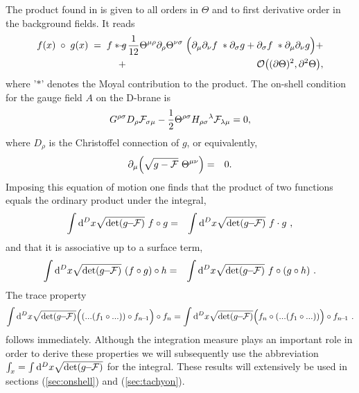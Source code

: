 \documentclass[a4paper,11pt]{article}               \def\new#1\endnew{{\bf #1}}
\newcommand {\ud} {\mathrm{d}}
\newcommand {\cF} {{\cal F}}
\newcommand {\cO}{{\cal O}}
\newcommand {\Back}{\!\!\!\!\!}
\begin{document}
The product found in \cite{Herbst:2001ai} is given to all orders in
$\Theta$ and to
first derivative order in the background fields. It reads
\begin{eqnarray}
  \label{eq:NCP}
  f(x) \; \circ \; g(x) \;=\; f * g 
  \Back&-&\Back \frac 1{12}
  \Theta^{\mu\rho} \partial_\rho \Theta^{\nu\sigma} \;
  \Bigl(\partial_\mu \partial_\nu f \;* \partial_\sigma g +
  \partial_\sigma f \;* \partial_\mu \partial_\nu g \Bigr) +\nonumber\\
  &+& \cO\bigl((\partial\Theta)^2,\partial^2\Theta\bigr) ,
\end{eqnarray}
where '$*$' denotes the Moyal contribution to the product. The
on-shell condition for the gauge field $A$ on the D-brane is
\begin{eqnarray}
  \label{eq:maxwell}
  G^{\rho\sigma}D_\rho \cF_{\sigma\mu}
  -\frac 12 \Theta^{\rho\sigma}H_{\rho\sigma}{}^\lambda \cF_{\lambda\mu} = 0,
\end{eqnarray}
where $D_\rho$ is the Christoffel connection of $g$, or equivalently,
\begin{eqnarray}
  \label{eq:eom1}
  \partial_\mu \Bigl(\sqrt{g-\cF}~\Theta^{\mu\nu}\Bigr) &=& 0.
\end{eqnarray}
Imposing this equation of motion one finds %
that the product of
two functions equals the ordinary product under the integral,
\begin{eqnarray}
  \label{eq:ordprod}
  \int \ud^{D} x \sqrt {\det(g\!\!-\!\!\cF)} ~f \circ g &=& 
  \int \ud^{D} x \sqrt {\det(g\!\!-\!\!\cF)} ~f \cdot g ~,
\end{eqnarray}
and %
that it is associative up to a surface term,
\begin{eqnarray}
  \label{eq:assocprod}
  \int \ud^{D} x \sqrt {\det(g\!\!-\!\!\cF)} ~(f \circ  g) \circ h &=& 
  \int \ud^{D} x \sqrt {\det(g\!\!-\!\!\cF)} ~ f \circ (g \circ  h) ~.
\end{eqnarray}
The trace property
\begin{eqnarray}
  \label{eq:trace}
  \int \ud^{D} x \sqrt {\det(g\!\!-\!\!\cF)} 
  \Bigl((...( f_1 \circ ...))\circ f_{n\!-\!1}\Bigr) \circ f_n = 
  \int \ud^{D} x \sqrt {\det(g\!\!-\!\!\cF)} 
  \Bigl(f_n \circ (...( f_1 \circ ... ))\Bigr)\circ f_{n\!-\!1} ~.
\end{eqnarray}
follows immediately. Although the integration measure plays an important
role in order to derive
these properties we will subsequently use the abbreviation
$\int _x = \int \ud^{D} x \sqrt {\det(g\!\!-\!\!\cF)}$ for the integral.
These results will extensively be used in sections
(\ref{sec:onshell}) and (\ref{sec:tachyon}).
\end{document}
